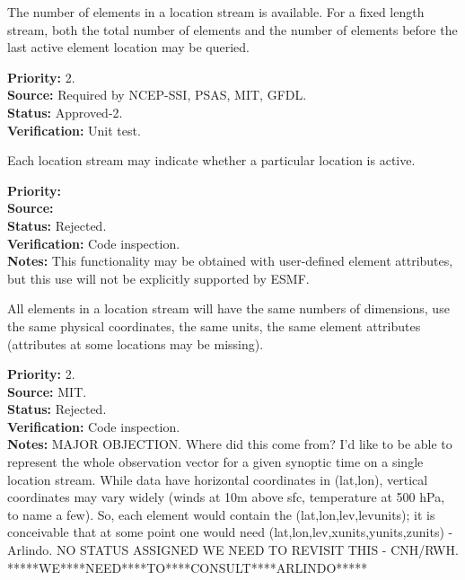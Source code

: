 The number of elements in a location stream is available.  For a fixed length stream,
both the total number of elements and the number of elements before the last
active element location may be queried.
\begin{reqlist}
{\bf Priority:} 2. \\
{\bf Source:} Required by NCEP-SSI, PSAS, MIT, GFDL.\\
{\bf Status:} Approved-2. \\
{\bf Verification:} Unit test. 
\end{reqlist}

Each location stream may indicate whether a particular location is active.

\begin{reqlist}
{\bf Priority:} \\
{\bf Source:} \\
{\bf Status:} Rejected. \\
{\bf Verification:} Code inspection. \\
{\bf Notes:} This functionality may be obtained with user-defined element
attributes, but this use will not be explicitly supported by ESMF.
\end{reqlist}


All elements in a location stream will have the same numbers of dimensions, use the
same physical coordinates, the same units, the same element attributes (attributes at
some locations may be missing).
\begin{reqlist}
{\bf Priority:} 2. \\
{\bf Source:} MIT. \\
{\bf Status:} Rejected. \\
{\bf Verification:} Code inspection. \\
{\bf Notes:} MAJOR OBJECTION. Where did this come from? I'd like to be able to represent the whole observation vector for a given synoptic time on a single location stream. While data have horizontal coordinates in (lat,lon), vertical coordinates may vary widely (winds at 10m above sfc, temperature at 500 hPa, to name a few). So, each element would contain the (lat,lon,lev,levunits); it is conceivable that at  some point one would need (lat,lon,lev,xunits,yunits,zunits) - Arlindo.
NO STATUS ASSIGNED WE NEED TO REVISIT THIS - CNH/RWH.
*****WE****NEED****TO****CONSULT****ARLINDO*****
\end{reqlist}


